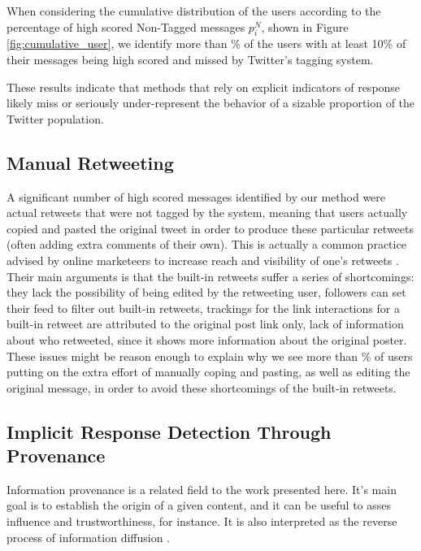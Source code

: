 When considering the cumulative distribution of the users according to the percentage of high scored Non-Tagged messages $p_i^N$, shown in Figure \ref{fig:cumulative_user}, we identify more than \usersMoreThanTenPctPct{}\% of the users with at least 10\% of their messages being high scored and missed by Twitter's tagging system. 

These results indicate that methods that rely on explicit indicators of response likely miss or seriously under-represent the behavior of a sizable proportion of the Twitter population.


\subsection{Manual Retweeting}

A significant number of high scored messages identified by our method were actual retweets that were not tagged by the system, meaning that users actually copied and pasted the original tweet in order to produce these particular retweets (often adding extra comments of their own). This is actually a common practice advised by online marketeers to increase reach and visibility of one's retweets \cite{ManualRetweet1, ManualRetweet2, ManualRetweet3}. Their main arguments is that the built-in retweets suffer a series of shortcomings: they lack the possibility of being edited by the retweeting user, followers can set their feed to filter out built-in retweets, trackings for the link interactions for a built-in retweet are attributed to the original post link only, lack of information about who retweeted, since it shows more information about the original poster. These issues might be reason enough to explain why we see more than \usersMoreThanTenPctPct{}\% of users putting on the extra effort of manually coping and pasting, as well as editing the original message, in order to avoid these shortcomings of the built-in retweets.

\subsection{Implicit Response Detection Through Provenance}

Information provenance is a related field to the work presented here. It's main goal is to establish the origin of a given content, and it can be useful to asses influence and trustworthiness, for instance. It is also interpreted as the reverse process of information diffusion \cite{taxidou2015}.

